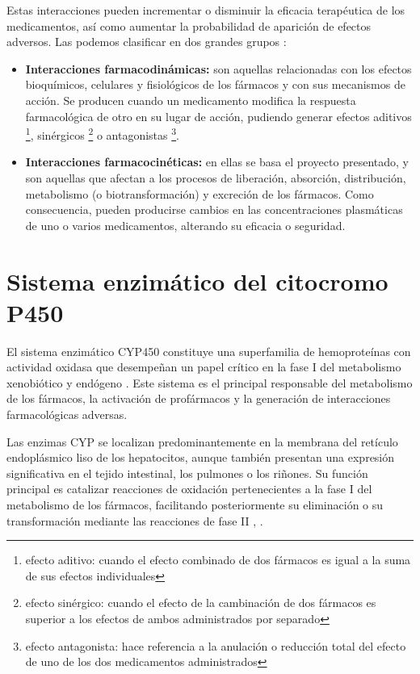 Estas interacciones pueden incrementar o disminuir la eficacia terapéutica de los medicamentos, así como aumentar la probabilidad de aparición de efectos adversos. 
Las podemos clasificar en dos grandes grupos \cite{udelar_manual_farmacologia} :
\begin{itemize}
    \item \textbf{Interacciones farmacodinámicas:} son aquellas relacionadas con los efectos bioquímicos, celulares y fisiológicos de los fármacos y con sus mecanismos de acción. Se producen cuando un medicamento modifica la respuesta farmacológica de otro en su lugar de acción, pudiendo generar efectos aditivos \footnote{efecto aditivo: cuando el efecto combinado de dos fármacos es igual a la suma de sus efectos individuales}, sinérgicos \footnote{efecto sinérgico: cuando el efecto de la cambinación de dos fármacos es superior a los efectos de ambos administrados por separado} o antagonistas \footnote{efecto antagonista: hace referencia a la anulación o reducción total del efecto de uno de los dos medicamentos administrados}.
    \item \textbf{Interacciones farmacocinéticas:} en ellas se basa el proyecto presentado, y son aquellas que afectan a los procesos de liberación, absorción, distribución, metabolismo (o biotransformación) y excreción de los fármacos. Como consecuencia, pueden producirse cambios en las concentraciones plasmáticas de uno o varios medicamentos, alterando su eficacia o seguridad.
\end{itemize}


\section{Sistema enzimático del citocromo P450}
El sistema enzimático CYP450 constituye una superfamilia de hemoproteínas con actividad oxidasa que desempeñan un papel crítico en la fase I del metabolismo xenobiótico y endógeno \cite{lorenzo2008manual}. Este sistema es el principal responsable del metabolismo de los fármacos, la activación de profármacos y la generación de interacciones farmacológicas adversas.

Las enzimas CYP se localizan predominantemente en la membrana del retículo endoplásmico liso de los hepatocitos, aunque también presentan una expresión significativa en el tejido intestinal, los pulmones o los riñones. Su función principal es catalizar reacciones de oxidación pertenecientes a la fase I del metabolismo de los fármacos, facilitando posteriormente su eliminación o su transformación mediante las reacciones de fase II \cite{sefh_medicamentos}, \cite{msd_metabolismo}.


